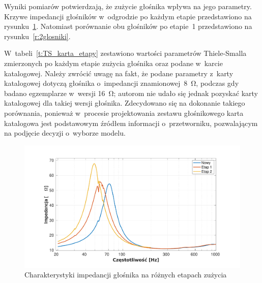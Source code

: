 \documentclass[12pt]{oska}
\begin{document}
	Wyniki pomiarów potwierdzają, że zużycie głośnika wpływa na jego parametry. Krzywe impedancji głośników w~odgrodzie po każdym etapie przedstawiono na rysunku~\ref{r:wygrzewanie}. Natomiast porównanie obu głośników po etapie~1 przedstawiono na rysunku~\ref{r:2glosniki}.
	
	W~tabeli~\ref{t:TS_karta_etapy} zestawiono wartości parametrów Thiele-Smalla zmierzonych po każdym etapie zużycia głośnika oraz podane w~karcie katalogowej. Należy zwrócić uwagę na fakt, że podane parametry z~karty katalogowej dotyczą głośnika o~impedancji znamionowej~\SI{8}{\ohm}, podczas gdy badano egzemplarze w~wersji \SI{16}{\ohm}; autorom nie udało się jednak pozyskać karty katalogowej dla takiej wersji głośnika. Zdecydowano się na dokonanie takiego porównania, ponieważ w~procesie projektowania zestawu głośnikowego karta katalogowa jest podstawowym źródłem informacji o~przetworniku, pozwalającym na podjęcie decyzji o~wyborze modelu.
	
	\begin{figure}[!ht]
	\centering
	\includegraphics[width=.8\textwidth,trim={2cm .5cm 2cm 1cm},clip]{odgroda_wygrzewanie.pdf}
	\caption{Charakterystyki impedancji głośnika na różnych etapach zużycia}
	\label{r:wygrzewanie}
	\end{figure}
	
\end{document}
